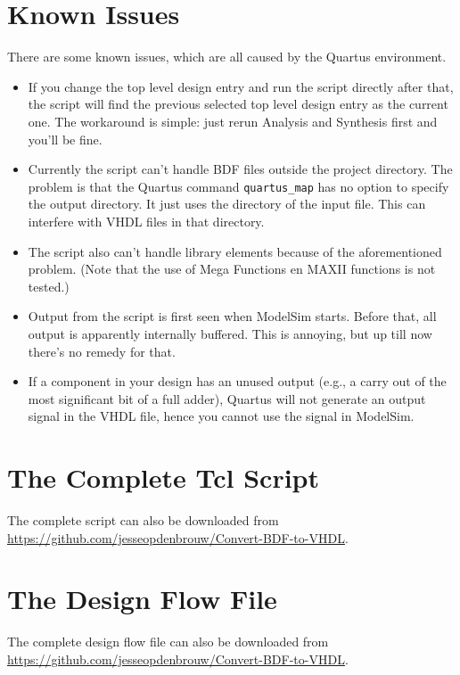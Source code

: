 \documentclass[11pt,a4paper,final,oneside,titlepage,fleqn]{article}
\begin{document}
\section{Known Issues}
\label{sec:issues}
There are some known issues, which are all caused by the Quartus
environment.
\begin{itemize}[itemsep=0pt]
\item If you change the top level design entry and run the script directly after
that, the script will find the previous selected top level design entry as
the current one. The workaround is simple: just
rerun Analysis and Synthesis first and you'll be fine.
\item Currently the script can't handle BDF files outside the project directory.
The problem is that the Quartus command \texttt{quartus\_map} has no option
to specify the output directory. It just uses the directory of the input
file. This can interfere with VHDL files in that directory.
\item The script also can't handle library elements because of the aforementioned
problem. (Note that the use of Mega Functions en MAXII functions is not
tested.)
\item Output from the script is first seen when ModelSim starts. Before that, all
output is apparently internally buffered. This is annoying, but up till now
there's no remedy for that.
\item If a component in your design has an unused output (e.g., a carry out of
the most significant bit of a full adder), Quartus will not generate an output
signal in the VHDL file, hence you cannot use the signal in ModelSim.
\end{itemize}

\newpage
\appendix
\section{The Complete Tcl Script}
\label{app:completescript}
The complete script can also be downloaded from \url{https://github.com/jesseopdenbrouw/Convert-BDF-to-VHDL}.


\newpage
\section{The Design Flow File}
\label{app:completeflowfile}
The complete design flow file can also be downloaded from \url{https://github.com/jesseopdenbrouw/Convert-BDF-to-VHDL}.

\end{document}
